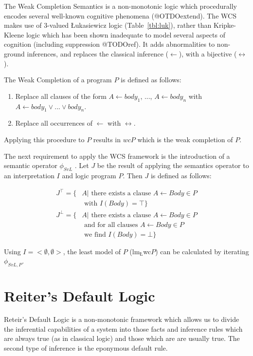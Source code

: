 The Weak Completion Semantics is a non-monotonic logic which procedurally encodes several well-known cognitive phenomena (@OTDOextend). The WCS makes use of 3-valued \L ukasiewicz logic (Table~\ref{tbl:luk}), rather than Kripke-Kleene logic which has been shown inadequate to model several aspects of cognition (including suppression @TODOref). It adds abnormalities to non-ground inferences, and replaces the classical inference ($\leftarrow$), with a bijective ($\leftrightarrow$). 

The Weak Completion of a program $P$ is defined as follows:

\begin{enumerate}
\item Replace all clauses of the form $A \leftarrow body_1$, ..., $A \leftarrow body_n$ with $A \leftarrow body_1 \lor ... \lor body_n$.
\item Replace all occurrences of $\leftarrow$ with $\leftrightarrow$.
\end{enumerate}

Applying this procedure to $P$ results in $wcP$ which is the weak completion of $P$.

The next requirement to apply the WCS framework is the introduction of a semantic operator $\phi_{SvL}$ \citep{stenning2008interpretation}. Let $J$ be the result of applying the semantics operator to an interpretation $I$ and logic program $P$. Then $J$ is defined as follows:

\[
\begin{split}
J^\top = \{ & A | \textrm{ there exists a clause } A\leftarrow Body \in P \\ & \textrm{ with } I(Body) = \top\}
\end{split}
\]
\[
\begin{split}
J^\bot = \{ &  A | \textrm{ there exists a clause } A \leftarrow Body \in P \\
           & \textrm{ and for all clauses } A \leftarrow Body \in P \\ & \textrm{ we find } I(Body) = \bot\}
\end{split}
\]

Using $I=<\emptyset, \emptyset>$, the least model of $P$ ($\textrm{lm}_\textrm{\L}$wc$P$) can be calculated by iterating $\phi_{SvL,P}$.

\section{Reiter's Default Logic} \label{ssec:reiter}
Reteir's Default Logic \citep{reiter1980logic} is a non-monotonic framework which allows us to divide the inferential capabilities of a system into those facts and inference rules which are always true (as in classical logic) and those which are are usually true. The second type of inference is the eponymous default rule.

